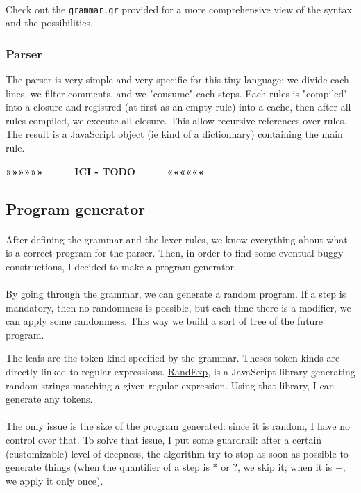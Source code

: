 \documentclass{article}
\newcommand\cc[1]{\texttt{#1}}
\newcommand\todo{\begin{center}\textbf{»»»»»» ~~~~~ICI - TODO~~~~~ ««««««}\end{center}}
\begin{document}
				\paragraph{} Check out the \cc{grammar.gr} provided for a more comprehensive view of the syntax and the possibilities.
			\subsubsection{Parser}
				The parser is very simple and very specific for this tiny language: we divide each lines, we filter comments, and we "consume" each steps. Each rules is "compiled" into a closure and registred (at first as an empty rule) into a cache, then after all rules compiled, we execute all closure. This allow recursive references over rules. The result is a JavaScript object (ie kind of a dictionnary) containing the main rule. \todo
			
		\subsection{Program generator}
			\paragraph{} After defining the grammar and the lexer rules, we know everything about what is a correct program for the parser. Then, in order to find some eventual buggy constructions, I decided to make a program generator.
			\paragraph{} By going through the grammar, we can generate a random program. If a step is mandatory, then no randomness is possible, but each time there is a modifier, we can apply some randomness. This way we build a sort of tree of the future program.
			
			The leafs are the token kind specified by the grammar. Theses token kinds are directly linked to regular expressions.  \href{https://fent.github.io/randexp.js/}{RandExp}, is a JavaScript library generating random strings matching a given regular expression. Using that library, I can generate any tokens.
			\paragraph{} The only issue is the size of the program generated: since it is random, I have no control over that. To solve that issue, I put some guardrail: after a certain (customizable) level of deepness, the algorithm try to stop as soon as possible to generate things (when the quantifier of a step is $*$ or $?$, we skip it; when it is $+$, we apply it only once).
			
\end{document}
